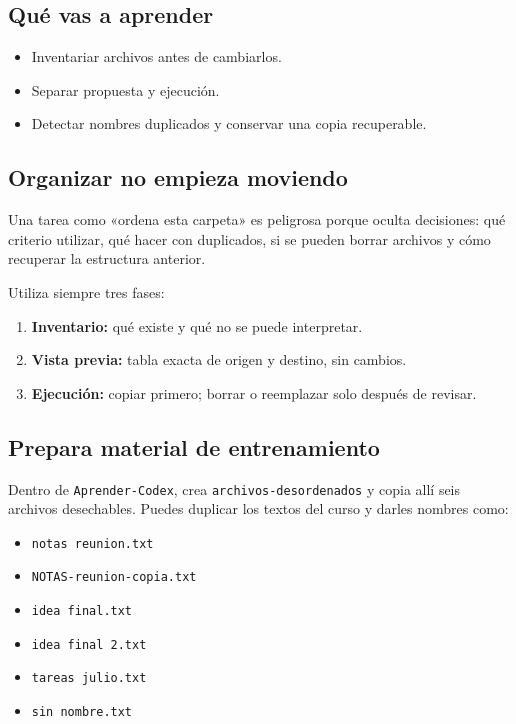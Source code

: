 \documentclass[10pt,a4paper,openany]{book}
\providecommand{\tightlist}{\setlength{\itemsep}{0.18em}\setlength{\parskip}{0pt}}
\begin{document}
\subsection{Qué vas a aprender}\label{quuxe9-vas-a-aprender-6}

\begin{itemize}
\tightlist
\item
  Inventariar archivos antes de cambiarlos.
\item
  Separar propuesta y ejecución.
\item
  Detectar nombres duplicados y conservar una copia recuperable.
\end{itemize}

\subsection{Organizar no empieza
moviendo}\label{organizar-no-empieza-moviendo}

Una tarea como «ordena esta carpeta» es peligrosa porque oculta
decisiones: qué criterio utilizar, qué hacer con duplicados, si se
pueden borrar archivos y cómo recuperar la estructura anterior.

Utiliza siempre tres fases:

\begin{enumerate}
\def\labelenumi{\arabic{enumi}.}
\tightlist
\item
  \textbf{Inventario:} qué existe y qué no se puede interpretar.
\item
  \textbf{Vista previa:} tabla exacta de origen y destino, sin cambios.
\item
  \textbf{Ejecución:} copiar primero; borrar o reemplazar solo después
  de revisar.
\end{enumerate}

\subsection{Prepara material de
entrenamiento}\label{prepara-material-de-entrenamiento}

Dentro de \texttt{Aprender-Codex}, crea \texttt{archivos-desordenados} y
copia allí seis archivos desechables. Puedes duplicar los textos del
curso y darles nombres como:

\begin{itemize}
\tightlist
\item
  \texttt{notas\ reunion.txt}
\item
  \texttt{NOTAS-reunion-copia.txt}
\item
  \texttt{idea\ final.txt}
\item
  \texttt{idea\ final\ 2.txt}
\item
  \texttt{tareas\ julio.txt}
\item
  \texttt{sin\ nombre.txt}
\end{itemize}
\end{document}
